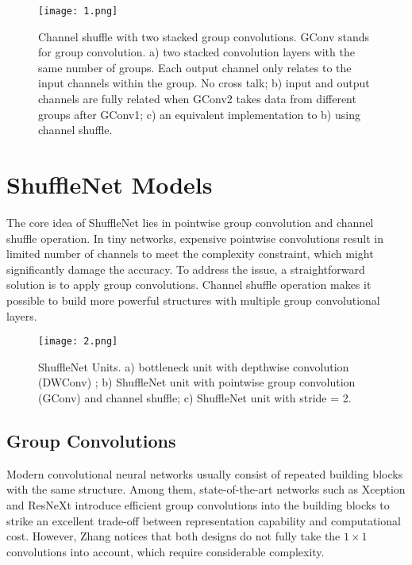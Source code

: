 \documentclass[10pt,twocolumn,letterpaper]{article}
\begin{document}
\begin{figure*}
	\begin{center}
		\texttt{[image: 1.png]}
	\end{center}
	\caption{Channel shuffle with two stacked group convolutions. GConv stands for group convolution. a) two stacked convolution layers with the same number of groups. Each output channel only relates to the input channels within the group. No cross talk; b) input and output channels are fully related when GConv2 takes data from different groups after GConv1; c) an equivalent implementation to b) using channel shuffle.}
	\label{fig:1}
\end{figure*}

\section{ShuffleNet Models}

The core idea of ShuffleNet lies in pointwise group convolution and channel shuffle operation. In tiny networks, expensive pointwise convolutions result in limited number of channels to meet the complexity constraint, which might significantly damage the accuracy. To address the issue, a straightforward solution is to apply group convolutions. Channel shuffle operation makes it possible to build more powerful structures with multiple group convolutional layers.

\begin{figure*}[!pb]
	\begin{center}
		\texttt{[image: 2.png]}
	\end{center}
	\caption{ShuffleNet Units. a) bottleneck unit \cite{he2016deep} with depthwise convolution (DWConv) \cite{howard2017mobilenets}; b) ShuffleNet unit with pointwise group convolution (GConv) and channel shuffle; c) ShuffleNet unit with stride = 2.}
	\label{fig:2}
\end{figure*}

\subsection{Group Convolutions}

Modern convolutional neural networks \cite{he2016identity} usually consist of repeated building blocks with the same structure. Among them, state-of-the-art networks such as Xception \cite{chollet2016xception} and ResNeXt \cite{xie2017aggregated} introduce efficient group convolutions into the building blocks to strike an excellent trade-off between representation capability and computational cost. However, Zhang notices that both designs do not fully take the $1\times 1$ convolutions into account, which require considerable complexity.
\end{document}
